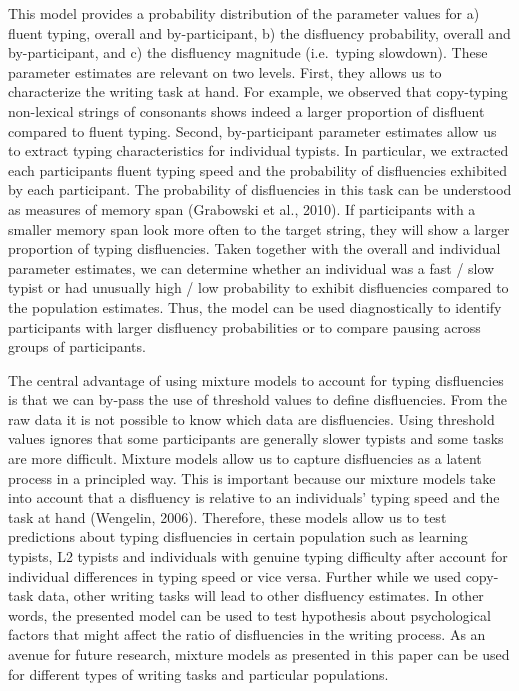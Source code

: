 \documentclass[english,man,floatsintext]{apa7}
\begin{document}
This model provides a probability distribution of the parameter values for a) fluent typing, overall and by-participant, b) the disfluency probability, overall and by-participant, and c) the disfluency magnitude (i.e.~typing slowdown). These parameter estimates are relevant on two levels. First, they allows us to characterize the writing task at hand. For example, we observed that copy-typing non-lexical strings of consonants shows indeed a larger proportion of disfluent compared to fluent typing. Second, by-participant parameter estimates allow us to extract typing characteristics for individual typists. In particular, we extracted each participants fluent typing speed and the probability of disfluencies exhibited by each participant. The probability of disfluencies in this task can be understood as measures of memory span (Grabowski et al., 2010). If participants with a smaller memory span look more often to the target string, they will show a larger proportion of typing disfluencies. Taken together with the overall and individual parameter estimates, we can determine whether an individual was a fast / slow typist or had unusually high / low probability to exhibit disfluencies compared to the population estimates. Thus, the model can be used diagnostically to identify participants with larger disfluency probabilities or to compare pausing across groups of participants.

The central advantage of using mixture models to account for typing disfluencies is that we can by-pass the use of threshold values to define disfluencies. From the raw data it is not possible to know which data are disfluencies. Using threshold values ignores that some participants are generally slower typists and some tasks are more difficult. Mixture models allow us to capture disfluencies as a latent process in a principled way. This is important because our mixture models take into account that a disfluency is relative to an individuals' typing speed and the task at hand (Wengelin, 2006). Therefore, these models allow us to test predictions about typing disfluencies in certain population such as learning typists, L2 typists and individuals with genuine typing difficulty after account for individual differences in typing speed or vice versa. Further while we used copy-task data, other writing tasks will lead to other disfluency estimates. In other words, the presented model can be used to test hypothesis about psychological factors that might affect the ratio of disfluencies in the writing process. As an avenue for future research, mixture models as presented in this paper can be used for different types of writing tasks and particular populations.
\end{document}
